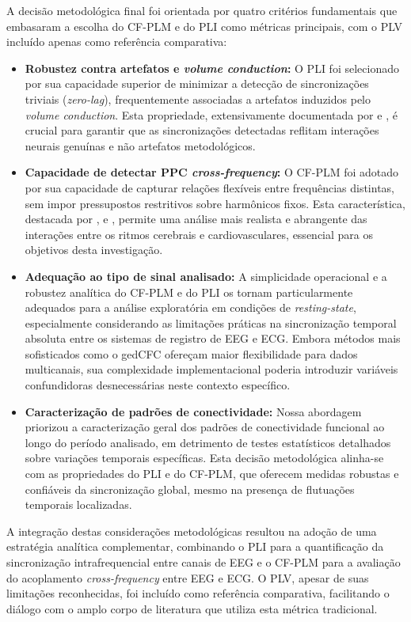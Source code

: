 A decisão metodológica final foi orientada por quatro critérios fundamentais que embasaram a escolha do CF-PLM e do PLI como métricas principais, com o PLV incluído apenas como referência comparativa:
\begin{itemize}
  \item \textbf{Robustez contra artefatos e \textit{volume conduction}:} O PLI foi selecionado por sua capacidade superior de minimizar a detecção de sincronizações triviais (\textit{zero-lag}), frequentemente associadas a artefatos induzidos pelo \textit{volume conduction}. Esta propriedade, extensivamente documentada por  e , é crucial para garantir que as sincronizações detectadas reflitam interações neurais genuínas e não artefatos metodológicos.
  \item \textbf{Capacidade de detectar PPC \textit{cross-frequency}:} O CF-PLM foi adotado por sua capacidade de capturar relações flexíveis entre frequências distintas, sem impor pressupostos restritivos sobre harmônicos fixos. Esta característica, destacada por ,  e , permite uma análise mais realista e abrangente das interações entre os ritmos cerebrais e cardiovasculares, essencial para os objetivos desta investigação.
  \item \textbf{Adequação ao tipo de sinal analisado:} A simplicidade operacional e a robustez analítica do CF-PLM e do PLI os tornam particularmente adequados para a análise exploratória em condições de \textit{resting-state}, especialmente considerando as limitações práticas na sincronização temporal absoluta entre os sistemas de registro de EEG e ECG. Embora métodos mais sofisticados como o gedCFC ofereçam maior flexibilidade para dados multicanais, sua complexidade implementacional poderia introduzir variáveis confundidoras desnecessárias neste contexto específico.
  \item \textbf{Caracterização de padrões de conectividade:} Nossa abordagem priorizou a caracterização geral dos padrões de conectividade funcional ao longo do período analisado, em detrimento de testes estatísticos detalhados sobre variações temporais específicas. Esta decisão metodológica alinha-se com as propriedades do PLI e do CF-PLM, que oferecem medidas robustas e confiáveis da sincronização global, mesmo na presença de flutuações temporais localizadas.
\end{itemize}

A integração destas considerações metodológicas resultou na adoção de uma estratégia analítica complementar, combinando o PLI para a quantificação da sincronização intrafrequencial entre canais de EEG e o CF-PLM para a avaliação do acoplamento \textit{cross-frequency} entre EEG e ECG. O PLV, apesar de suas limitações reconhecidas, foi incluído como referência comparativa, facilitando o diálogo com o amplo corpo de literatura que utiliza esta métrica tradicional.

